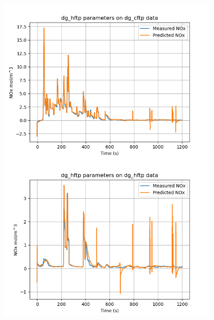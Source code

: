 \begin{figure}[H]
        \begin{minipage}{0.33\textwidth}
                \includegraphics[width = \textwidth]{./figs/figs_new_mdl/dg_hftp_dg_cftp.png}
        \end{minipage}
        \begin{minipage}{0.33\textwidth}
                \includegraphics[width = \textwidth]{./figs/figs_new_mdl/dg_hftp_dg_hftp.png}
        \end{minipage}
        \begin{minipage}{0.33\textwidth}

\end{minipage}
\end{figure}
